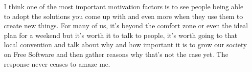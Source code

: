 I think one of the most important motivation factors is to see people being able to adopt the solutions you come up with and even more when they use them to create new things. For many of us, it's beyond the comfort zone or even the ideal plan for a weekend but it's worth it to talk to people, it's worth going to that local convention and talk about why and how important it is to grow our society on Free Software and then gather reasons why that's not the case yet. The response never ceases to amaze me.
